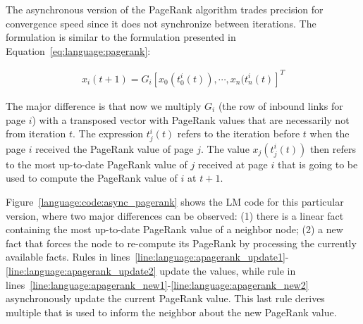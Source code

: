 The asynchronous version of the PageRank algorithm trades precision for
convergence speed since it does not synchronize between iterations.
The formulation is similar to the formulation presented in
Equation~\ref{eq:language:pagerank}:

\begin{align}
x_{i}(t + 1) = G_{i} [x_{0}(t^{i}_{0}(t)), \cdots, x_{n}(t^{i}_{n}(t)]^{T}\label{eq:appendix:pagerank_async}
\end{align}

The major difference is that now we multiply $G_{i}$ (the row of inbound links
for page $i$) with a transposed vector with PageRank values that are necessarily
not from iteration $t$. The expression $t^{i}_{j}(t)$ refers to the iteration
before $t$ when the page $i$ received the PageRank value of page $j$. The value
$x_{j}(t^{i}_{j}(t))$ then refers to the most up-to-date PageRank value of $j$
received at page $i$ that is going to be used to compute the PageRank value of
$i$ at $t + 1$.

Figure~\ref{language:code:async_pagerank} shows the LM code for this particular
version, where two major differences can be observed: (1) there is a linear fact
 containing the most up-to-date PageRank value of a
neighbor node; (2) a new  fact that forces the node to re-compute
its PageRank by processing the currently available 
facts. Rules in
lines~\ref{line:language:apagerank_update1}-\ref{line:language:apagerank_update2}
update the  values, while rule in
lines~\ref{line:language:apagerank_new1}-\ref{line:language:apagerank_new2}
asynchronously update the current PageRank value. This last rule derives
multiple  that is used to inform the neighbor about the
new PageRank value.

